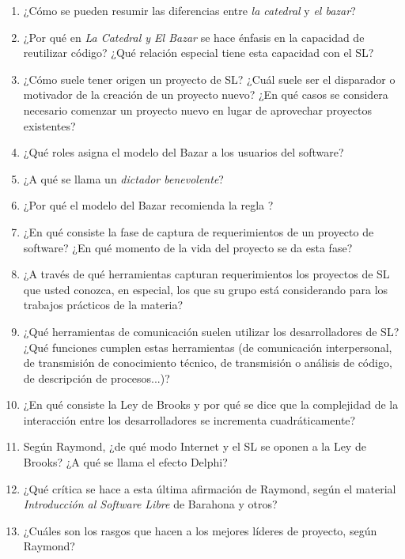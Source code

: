 \begin{enumerate}
	\item ¿Cómo se pueden resumir las diferencias entre \emph{la catedral} y \emph{el bazar}?
	\item ¿Por qué en \emph{La Catedral y El Bazar} se hace énfasis en la capacidad de reutilizar código? ¿Qué relación especial tiene esta capacidad con el SL? 
	\item ¿Cómo suele tener origen un proyecto de SL? ¿Cuál suele ser el disparador o motivador de la creación de un proyecto nuevo? ¿En qué casos se considera necesario comenzar un proyecto nuevo en lugar de aprovechar proyectos existentes?
	\item ¿Qué roles asigna el modelo del Bazar a los usuarios del software?
	\item ¿A qué se llama un \emph{dictador benevolente}?
	\item ¿Por qué el modelo del Bazar recomienda la regla ?
	\item ¿En qué consiste la fase de captura de requerimientos de un proyecto de software? ¿En qué momento de la vida del proyecto se da esta fase?
	\item ¿A través de qué herramientas capturan requerimientos los proyectos de SL que usted conozca, en especial, los que su grupo está considerando para los trabajos prácticos de la materia?
	\item ¿Qué herramientas de comunicación suelen utilizar los desarrolladores de SL? ¿Qué funciones cumplen estas herramientas (de comunicación interpersonal, de transmisión de conocimiento técnico, de transmisión o análisis de código, de descripción de procesos...)?
	\item ¿En qué consiste la Ley de Brooks y por qué se dice que la complejidad de la interacción entre los desarrolladores se incrementa cuadráticamente? 
	\item Según Raymond, ¿de qué modo Internet y el SL se oponen a la Ley de Brooks? ¿A qué se llama el efecto Delphi?
	\item ¿Qué crítica se hace a esta última afirmación de Raymond, según el material \emph{Introducción al Software Libre} de Barahona y otros? 
	\item ¿Cuáles son los rasgos que hacen a los mejores líderes de proyecto, según Raymond?
\end{enumerate}


